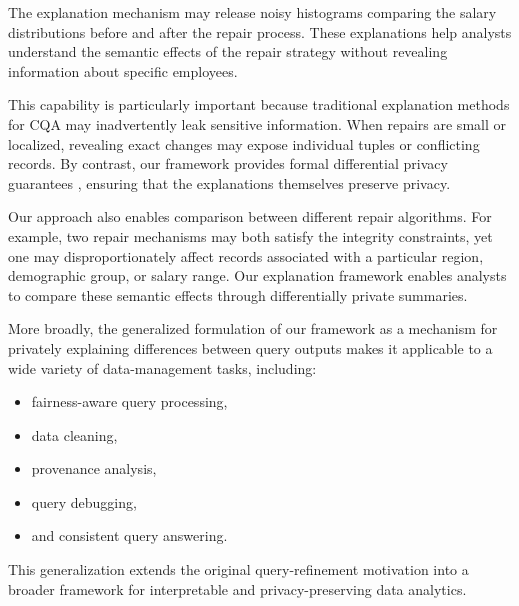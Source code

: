 The explanation mechanism may release noisy histograms comparing
the salary distributions before and after the repair process.
These explanations help analysts understand the semantic effects
of the repair strategy without revealing information about specific employees.

This capability is particularly important because traditional explanation methods
for CQA may inadvertently leak sensitive information.
When repairs are small or localized,
revealing exact changes may expose individual tuples or conflicting records.
By contrast, our framework provides formal differential privacy guarantees
\cite{TheAlgFoundDP2014}, ensuring that the explanations themselves
preserve privacy.

Our approach also enables comparison between different repair algorithms.
For example, two repair mechanisms may both satisfy the integrity constraints,
yet one may disproportionately affect records associated with a particular region,
demographic group, or salary range.
Our explanation framework enables analysts to compare these semantic effects
through differentially private summaries.

More broadly, the generalized formulation of our framework
as a mechanism for privately explaining differences between query outputs
makes it applicable to a wide variety of data-management tasks,
including:
\begin{itemize}
    \item fairness-aware query processing,
    \item data cleaning,
    \item provenance analysis,
    \item query debugging,
    \item and consistent query answering.
\end{itemize}

This generalization extends the original query-refinement motivation
into a broader framework for interpretable and privacy-preserving
data analytics.

